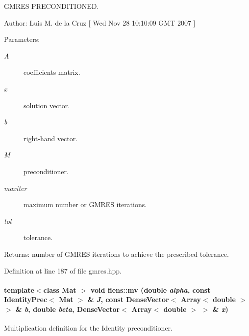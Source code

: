 GMRES PRECONDITIONED. 

\begin{Desc}
\item[Author:]Luis M. de la Cruz \mbox{[} Wed Nov 28 10:10:09 GMT 2007 \mbox{]} \end{Desc}
\begin{Desc}
\item[Parameters:]
\begin{description}
\item[{\em A}]coefficients matrix. \item[{\em x}]solution vector. \item[{\em b}]right-hand vector. \item[{\em M}]preconditioner. \item[{\em maxiter}]maximum number or GMRES iterations. \item[{\em tol}]tolerance. \end{description}
\end{Desc}
\begin{Desc}
\item[Returns:]number of GMRES iterations to achieve the prescribed tolerance. \end{Desc}


Definition at line 187 of file gmres.hpp.\hypertarget{namespaceflens_84086cd2974976c7b90f661e592c0fae}{
\paragraph[{mv}]{\setlength{\rightskip}{0pt plus 5cm}template$<$class Mat $>$ void flens::mv (double {\em alpha}, \/  const IdentityPrec$<$ {\bf Mat} $>$ \& {\em J}, \/  const DenseVector$<$ Array$<$ double $>$ $>$ \& {\em b}, \/  double {\em beta}, \/  DenseVector$<$ Array$<$ double $>$ $>$ \& {\em x})}\hfill}
\label{namespaceflens_84086cd2974976c7b90f661e592c0fae}


Multiplication definition for the Identity preconditioner. 

